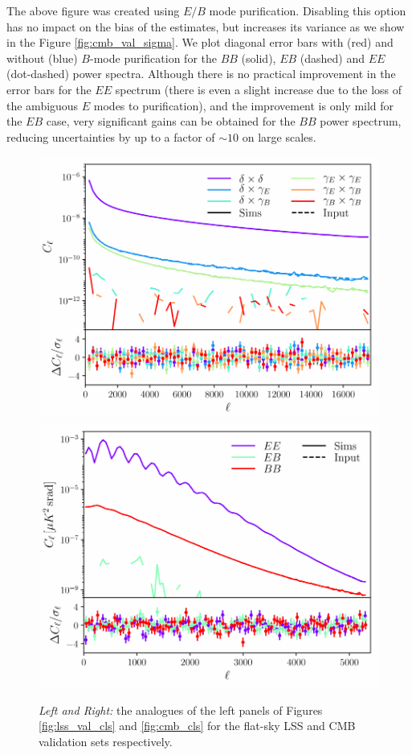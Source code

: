 \documentclass[usenatbib]{mnrasb}
\begin{document}
      The above figure was created using $E/B$ mode purification. Disabling this option has no impact on the bias of the estimates, but increases its variance as we show in the Figure \ref{fig:cmb_val_sigma}. We plot diagonal error bars with (red) and without (blue) $B$-mode purification for the $BB$ (solid), $EB$ (dashed) and $EE$ (dot-dashed) power spectra. Although there is no practical improvement in the error bars for the $EE$ spectrum (there is even a slight increase due to the loss of the ambiguous $E$ modes to purification), and the improvement is only mild for the $EB$ case, very significant gains can be obtained for the $BB$ power spectrum, reducing uncertainties by up to a factor of $\sim10$ on large scales.
      \begin{figure}
        \centering
        \includegraphics[width=0.99\columnwidth]{val_cl_lss_flat}
        \includegraphics[width=0.99\columnwidth]{val_cl_cmb_flat}
        \caption{{\sl Left and Right:} the analogues of the left panels of Figures \ref{fig:lss_val_cls} and \ref{fig:cmb_cls} for the flat-sky LSS and CMB validation sets respectively.} \label{fig:val_cls_flat}
      \end{figure}
      
\end{document}
